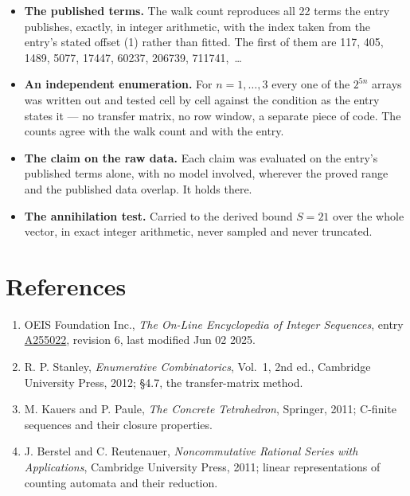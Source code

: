 \documentclass[11pt]{article}
\theoremstyle{definition}
\begin{document}
\begin{itemize}

\item {\bfseries The published terms.} The walk count reproduces all 22 terms the entry publishes, exactly, in integer arithmetic, with the index taken from the entry's stated offset (1) rather than fitted. The first of them are 117, 405, 1489, 5077, 17447, 60237, 206739, 711741,~\dots

\item {\bfseries An independent enumeration.} For $n = 1,\dots,3$ every one of the $2^{5n}$ arrays was written out and tested cell by cell against the condition as the entry states it --- no transfer matrix, no row window, a separate piece of code. The counts agree with the walk count and with the entry.

\item {\bfseries The claim on the raw data.} Each claim was evaluated on the entry's published terms alone, with no model involved, wherever the proved range and the published data overlap. It holds there.

\item {\bfseries The annihilation test.} Carried to the derived bound $S = 21$ over the whole vector, in exact integer arithmetic, never sampled and never truncated.

\end{itemize}

\section{References}

\begin{enumerate}

\item OEIS Foundation Inc., \emph{The On-Line Encyclopedia of Integer Sequences}, entry \href{https://oeis.org/A255022}{A255022}, revision 6, last modified Jun 02 2025.

\item R. P. Stanley, \emph{Enumerative Combinatorics}, Vol.~1, 2nd ed., Cambridge University Press, 2012; \S4.7, the transfer-matrix method.

\item M. Kauers and P. Paule, \emph{The Concrete Tetrahedron}, Springer, 2011; C-finite sequences and their closure properties.

\item J. Berstel and C. Reutenauer, \emph{Noncommutative Rational Series with Applications}, Cambridge University Press, 2011; linear representations of counting automata and their reduction.

\end{enumerate}
\end{document}
